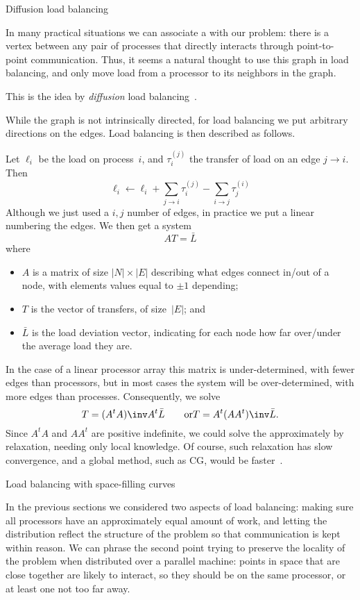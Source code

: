  {Diffusion load balancing}

In many practical situations we can associate a
 with our problem: there is a vertex
between any pair of processes that directly interacts through
point-to-point communication. Thus, it seems a natural thought to use
this graph in load balancing, and only move load from a processor to
its neighbors in the graph.

This is the idea by 
\emph{diffusion} load
balancing~\cite{Cybenko:1989:balancing,HuBlake:diffusion1999}.

While the graph is not intrinsically directed, for load balancing we
put arbitrary directions on the edges. Load balancing is then
described as follows.

Let $\ell_i$ be the
load on process~$i$, and $\tau^{(j)}_i$ the transfer of load on an edge
$j\rightarrow i$. Then
\[ \ell_i \leftarrow \ell_i
    + \sum_{j\rightarrow i} \tau^{(j)}_i
    - \sum_{i\rightarrow j} \tau^{(i)}_j
\]
Although we just used a $i,j$ number of edges, in practice
we put a linear numbering the edges. We then get a system
\[ AT=\bar L \]
where
\begin{itemize}
\item $A$ is a matrix of size $|N|\times|E|$ describing what edges
  connect in/out of a node, with elements values equal to $\pm1$ depending;
\item $T$ is the vector of transfers, of size~$|E|$; and
\item $\bar L$ is the load deviation vector, indicating for each node
  how far over/under the average load they are.
\end{itemize}

In the case of a linear processor array this matrix is
under-determined, with fewer edges than processors, but in most cases the
system will be over-determined, with more edges than processes.
Consequently, we solve
%
\[ T= (A^tA)\inv A^t\bar L \qquad\hbox{or} T=A^t(AA^t)\inv \bar L. \]
%
Since $A^tA$ and $AA^t$ are positive indefinite, we could solve the
approximately by relaxation, needing only local knowledge.
Of course, such relaxation has slow convergence, and a global method,
such as \ac{CG}, would be faster~\cite{HuBlake:diffusion1999}.

 {Load balancing with space-filling curves}
\label{sec:space-filling}

In the previous sections we considered two aspects of load balancing:
making sure all processors have an approximately equal amount of work,
and letting the distribution reflect the structure of the problem so
that communication is kept within reason. We can phrase the second
point trying to preserve the locality of the problem when
distributed over a parallel machine: points in space that are close together
are likely to interact, so they should be on the same processor, or
at least one not too far away.

